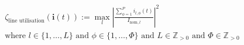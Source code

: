 \begin{equation}
\begin{split}
	\zeta_\text{line utilisation}(\textbf{i}(t)) :=
	\max_{l}{\left|\frac{\sum_{\phi=1}^{P}{i_{l,\phi}(t)}}{I_{\text{nom},l}}\right|^2} \\
	\text{where } l \in \{1, \dots, L\} \text{ and } \phi \in \{1, \dots, \Phi\} \text{ and } L \in \mathbb{Z}_{>0} \text{ and } \Phi \in \mathbb{Z}_{>0}
\end{split}
\label{ch1:equ:line-utilisation}
\end{equation}